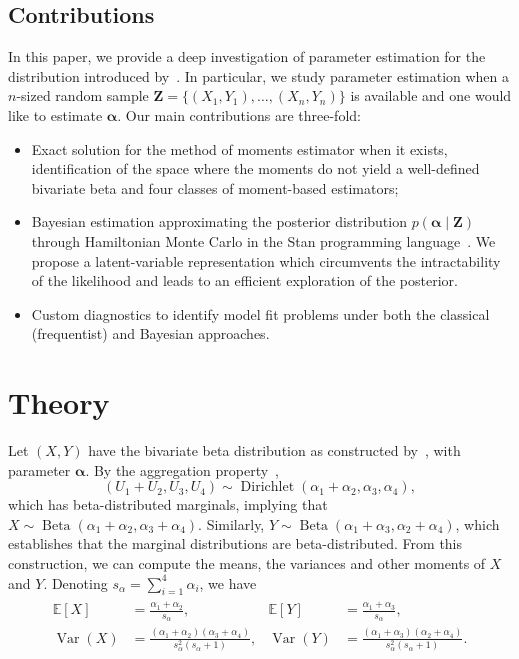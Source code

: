 \documentclass[a4paper, notitlepage, 10pt]{article}
\newcommand{\dd}{\boldsymbol{Z}}
\newcommand{\parameter}{\boldsymbol{\alpha}}
\newcommand{\ev}{\mathbb{E}}
\newcommand{\var}{\operatorname{Var}}
\theoremstyle{definition}
\begin{document}
\subsection{Contributions}\label{sec:contributions}

In this paper, we provide a deep investigation of parameter estimation for the distribution introduced by~\cite{olkin2015constructions}.
In particular, we study parameter estimation when a $n$-sized random sample $\dd = \{ (X_1, Y_1), \ldots, (X_n, Y_n) \}$ is available and one would like to estimate $\boldsymbol{\alpha}$.
Our main contributions are three-fold:
\begin{itemize}
    \item Exact solution for the method of moments estimator when it exists, identification of the space where the moments do not yield a well-defined bivariate beta and four classes of moment-based estimators;
    
    \item Bayesian estimation approximating the posterior distribution $p(\boldsymbol{\alpha} \mid \dd)$ through Hamiltonian Monte Carlo in the Stan programming language~\citep{carpenter2017stan,stan}. 
    We propose a latent-variable representation which circumvents the intractability of the likelihood and leads to an efficient exploration of the posterior.
    
    \item Custom diagnostics to identify model fit problems under both the classical (frequentist) and Bayesian approaches. 
\end{itemize}

\section{Theory}\label{sec:theory}

Let $(X, Y)$ have the bivariate beta distribution as constructed by~\cite{olkin2015constructions},  with parameter $\parameter$.
By the aggregation property~\cite[Section 2.2]{ng2011dirichlet},
\[
(U_1 + U_2, U_3, U_4) \sim \operatorname{Dirichlet}(\alpha_1 + \alpha_2, \alpha_3, \alpha_4),
\]
which has beta-distributed marginals, implying that $X \sim \operatorname{Beta}(\alpha_1 + \alpha_2, \alpha_3 + \alpha_4)$.
Similarly, $Y \sim \operatorname{Beta}(\alpha_1 + \alpha_3, \alpha_2 + \alpha_4)$, which establishes that the marginal distributions are beta-distributed.
From this construction, we can compute the means, the variances and other moments of $X$ and $Y$.
Denoting $s_{\alpha} = \sum_{i=1}^4 \alpha_i$, we have 
\begin{gather}
    \begin{aligned}
    \ev[X] &= \frac{\alpha_1 + \alpha_2}{s_{\alpha}},
    & \ev[Y] &= \frac{\alpha_1 + \alpha_3}{s_{\alpha}},
    \\
    \var(X) &= \frac{(\alpha_1 + \alpha_2)(\alpha_3 + \alpha_4)}{s_{\alpha}^2(s_{\alpha} + 1)},
    & \var(Y) &= \frac{(\alpha_1 + \alpha_3)(\alpha_2 + \alpha_4)}{s_{\alpha}^2(s_{\alpha} + 1)}.
    \end{aligned}
\end{gather} 
\end{document}
